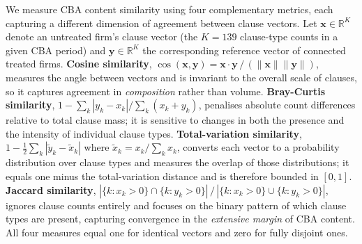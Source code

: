 We measure CBA content similarity using four complementary metrics, each capturing a different dimension of agreement between clause vectors.
Let $\mathbf{x} \in \mathbb{R}^K$ denote an untreated firm's clause vector (the $K = 139$ clause-type counts in a given CBA period) and $\mathbf{y} \in \mathbb{R}^K$ the corresponding reference vector of connected treated firms.
\textbf{Cosine similarity}, $\cos(\mathbf{x}, \mathbf{y}) = \mathbf{x} \cdot \mathbf{y} \,/\, (\|\mathbf{x}\| \|\mathbf{y}\|)$, measures the angle between vectors and is invariant to the overall scale of clauses, so it captures agreement in \emph{composition} rather than volume.
\textbf{Bray-Curtis similarity}, $1 - \sum_k |y_k - x_k| / \sum_k (x_k + y_k)$, penalises absolute count differences relative to total clause mass; it is sensitive to changes in both the presence and the intensity of individual clause types.
\textbf{Total-variation similarity}, $1 - \tfrac{1}{2}\sum_k |\tilde{y}_k - \tilde{x}_k|$ where $\tilde{x}_k = x_k / \sum_k x_k$, converts each vector to a probability distribution over clause types and measures the overlap of those distributions; it equals one minus the total-variation distance and is therefore bounded in $[0,1]$.
\textbf{Jaccard similarity}, $|\{k : x_k > 0\} \cap \{k : y_k > 0\}| \,/\, |\{k : x_k > 0\} \cup \{k : y_k > 0\}|$, ignores clause counts entirely and focuses on the binary pattern of which clause types are present, capturing convergence in the \emph{extensive margin} of CBA content.
All four measures equal one for identical vectors and zero for fully disjoint ones.
